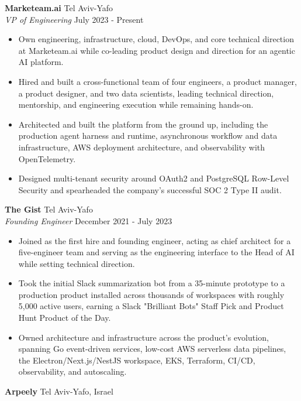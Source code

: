 \documentclass[a4paper]{article}
\begin{document}
\textbf{Marketeam.ai} \hfill Tel Aviv-Yafo\\
\textit{VP of Engineering} \hfill July 2023 - Present\\
\vspace{-1mm}
\begin{itemize} \itemsep 1pt
	\item Own engineering, infrastructure, cloud, DevOps, and core technical direction at Marketeam.ai while co-leading product design and direction for an agentic AI platform.
	\item Hired and built a cross-functional team of four engineers, a product manager, a product designer, and two data scientists, leading technical direction, mentorship, and engineering execution while remaining hands-on.
	\item Architected and built the platform from the ground up, including the production agent harness and runtime, asynchronous workflow and data infrastructure, AWS deployment architecture, and observability with OpenTelemetry.
	\item Designed multi-tenant security around OAuth2 and PostgreSQL Row-Level Security and spearheaded the company's successful SOC 2 Type II audit.
\end{itemize}
\textbf{The Gist} \hfill Tel Aviv-Yafo\\
\textit{Founding Engineer} \hfill December 2021 - July 2023\\
\vspace{-1mm}
\begin{itemize} \itemsep 1pt
	\item Joined as the first hire and founding engineer, acting as chief architect for a five-engineer team and serving as the engineering interface to the Head of AI while setting technical direction.
	\item Took the initial Slack summarization bot from a 35-minute prototype to a production product installed across thousands of workspaces with roughly 5,000 active users, earning a Slack "Brilliant Bots" Staff Pick and Product Hunt Product of the Day.
	\item Owned architecture and infrastructure across the product's evolution, spanning Go event-driven services, low-cost AWS serverless data pipelines, the Electron/Next.js/NestJS workspace, EKS, Terraform, CI/CD, observability, and autoscaling.
\end{itemize}
\textbf{Arpeely} \hfill Tel Aviv-Yafo, Israel\\
\end{document}
